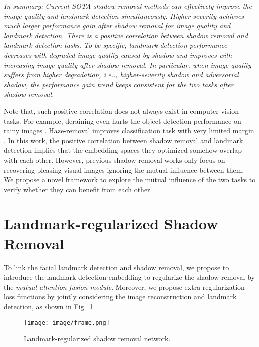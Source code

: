\documentclass[10pt,twocolumn,letterpaper]{article}
\makeatletter
\newcommand{\figref}[1]{Fig.~\ref{#1}}
\DeclareRobustCommand\onedot{\futurelet\@let@token\@onedot}
\def\@onedot{\ifx\@let@token.\else.\null\fi\xspace}
\def\ie{\emph{i.e}\onedot} \def\Ie{\emph{I.e}\onedot}
\makeatother
\begin{document}
\textit{In summary:  Current SOTA shadow removal methods can effectively improve the image quality and landmark detection simultaneously.  Higher-severity achieves much larger performance gain after shadow removal for image quality and landmark detection.  There is a positive correlation between shadow removal and landmark detection tasks. To be specific, landmark detection performance decreases with degraded image quality caused by shadow and improves with increasing image quality after shadow removal. In particular, when image quality suffers from higher degradation, \ie, higher-severity shadow and adversarial shadow, the performance gain trend keeps consistent for the two tasks after shadow removal.} 

Note that, such positive correlation does not always exist in computer vision tasks. For example, deraining even hurts the object detection performance on rainy images \cite{hnewa2020object}. Haze-removal improves classification task with very limited margin \cite{pei2019effects}. In this work, the positive correlation between shadow removal and landmark detection implies that the embedding spaces they optimized somehow overlap with each other. However, previous shadow removal works \cite{hu2019mask,le2019shadow,fu2021auto} only focus on recovering pleasing visual images ignoring the mutual influence between them. 
We propose a novel framework to explore the mutual influence of the two tasks to verify whether they can benefit from each other.


\section{Landmark-regularized Shadow Removal}

%
To link the facial landmark detection and shadow removal, we propose to introduce the landmark detection embedding to regularize the shadow removal by the \textit{mutual attention fusion module}. Moreover, we propose extra regularization loss functions by jointly considering the image reconstruction and landmark detection, as shown in \figref{fig:framework}.

\begin{figure}[t]
\centering
\texttt{[image: image/frame.png]}
\caption{Landmark-regularized shadow removal network.}
\label{fig:framework}
\end{figure}
\end{document}
